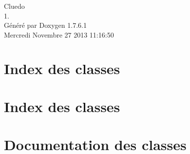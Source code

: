 \documentclass[a4paper]{book}
\begin{document}
\hypersetup{pageanchor=false,citecolor=blue}
\begin{titlepage}
\vspace*{7cm}
\begin{center}
{\Large \-Cluedo \\[1ex]\large 1. }\\
\vspace*{1cm}
{\large \-Généré par Doxygen 1.7.6.1}\\
\vspace*{0.5cm}
{\small Mercredi Novembre 27 2013 11:16:50}\\
\end{center}
\end{titlepage}
\clearemptydoublepage
{}
\tableofcontents
\clearemptydoublepage
{}
\hypersetup{pageanchor=true,citecolor=blue}
\chapter{\-Index des classes}

\chapter{\-Index des classes}

\chapter{\-Documentation des classes}




































\printindex
\end{document}
